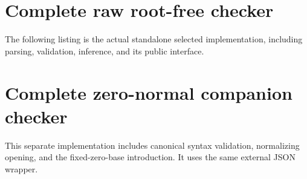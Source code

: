 \documentclass[11pt]{article}
\theoremstyle{definition}
\begin{document}

\clearpage
\section{Complete raw root-free checker}
The following listing is the actual standalone selected implementation,
including parsing, validation, inference, and its public interface.

\clearpage
\section{Complete zero-normal companion checker}
This separate implementation includes canonical syntax validation,
normalizing opening, and the fixed-zero-base introduction. It uses the
same external JSON wrapper.
\end{document}
